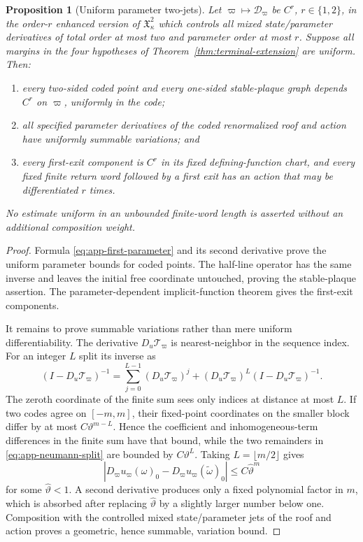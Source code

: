 \documentclass[11pt]{amsart}
\numberwithin{equation}{section}
\newtheorem{proposition}[theorem]{Proposition}
\theoremstyle{definition}
\theoremstyle{remark}
\begin{document}
\begin{proposition}[Uniform parameter two-jets]
\label{prop:app-parameter-jets}
Let $\varpi\mapsto\mathcal D_\varpi$ be $C^r$, $r\in\{1,2\}$, in the order-$r$ enhanced
version of $\mathfrak X_\kappa^2$ which controls all mixed
state/parameter derivatives of total order at most two and parameter order
at most $r$.  Suppose all margins in the four hypotheses of
Theorem~\ref{thm:terminal-extension} are uniform.  Then:
\begin{enumerate}
\item every two-sided coded point and every one-sided stable-plaque graph
depends $C^r$ on $\varpi$, uniformly in the code;
\item all specified parameter derivatives of the coded renormalized roof
and action have uniformly summable variations; and
\item every first-exit component is $C^r$ in its fixed defining-function
chart, and every fixed finite return word followed by a first exit has an action that may be differentiated
$r$ times.
\end{enumerate}
No estimate uniform in an unbounded finite-word length is asserted
without an additional composition weight.
\end{proposition}

\begin{proof}
Formula \eqref{eq:app-first-parameter} and its second derivative prove the
uniform parameter bounds for coded points.  The half-line operator has the
same inverse and leaves the initial free coordinate untouched, proving the
stable-plaque assertion.  The parameter-dependent implicit-function
theorem gives the first-exit components.

It remains to prove summable variations rather than mere uniform
differentiability.  The derivative $D_u\mathcal T_\varpi$ is nearest-neighbor in
the sequence index.  For an integer $L$ split its inverse as
\begin{equation}\label{eq:app-neumann-split}
 (I-D_u\mathcal T_\varpi)^{-1}
 =\sum_{j=0}^{L-1}(D_u\mathcal T_\varpi)^j
 +(D_u\mathcal T_\varpi)^L(I-D_u\mathcal T_\varpi)^{-1}.
\end{equation}
The zeroth coordinate of the finite sum sees only indices at distance at
most $L$.  If two codes agree on $[-m,m]$, their fixed-point coordinates
on the smaller block differ by at most $C\vartheta^{m-L}$.  Hence the
coefficient and inhomogeneous-term differences in the finite sum have that
bound, while the two remainders in \eqref{eq:app-neumann-split} are bounded
by $C\vartheta^L$.  Taking $L=\lfloor m/2\rfloor$ gives
\begin{equation}\label{eq:app-parameter-variation}
 |D_\varpi u_\varpi(\omega)_0-D_\varpi u_\varpi(\widetilde\omega)_0|
 \le C\widehat\vartheta^m
\end{equation}
for some $\widehat\vartheta<1$.  A second derivative produces only a fixed
polynomial factor in $m$, which is absorbed after replacing
$\widehat\vartheta$ by a slightly larger number below one.  Composition
with the controlled mixed state/parameter jets of the roof and action
proves a geometric, hence summable, variation bound.
\end{proof}
\end{document}
